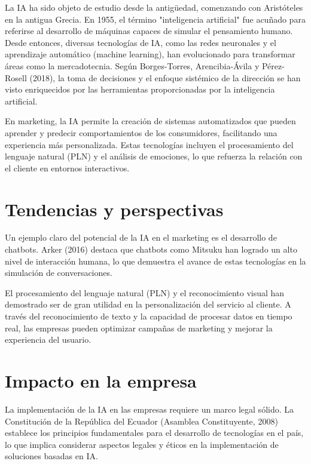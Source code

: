 \documentclass[9pt]{article}
\begin{document}
La IA ha sido objeto de estudio desde la antigüedad, comenzando con Aristóteles en la antigua Grecia. En 1955, el término "inteligencia artificial" fue acuñado para referirse al desarrollo de máquinas capaces de simular el pensamiento humano. Desde entonces, diversas tecnologías de IA, como las redes neuronales y el aprendizaje automático (machine learning), han evolucionado para transformar áreas como la mercadotecnia. Según Borges-Torres, Arencibia-Ávila y Pérez-Rosell (2018), la toma de decisiones y el enfoque sistémico de la dirección se han visto enriquecidos por las herramientas proporcionadas por la inteligencia artificial.
\cite{borges2018toma}

En marketing, la IA permite la creación de sistemas automatizados que pueden aprender y predecir comportamientos de los consumidores, facilitando una experiencia más personalizada. Estas tecnologías incluyen el procesamiento del lenguaje natural (PLN) y el análisis de emociones, lo que refuerza la relación con el cliente en entornos interactivos.

\section*{Tendencias y perspectivas}

Un ejemplo claro del potencial de la IA en el marketing es el desarrollo de chatbots. Arker (2016) destaca que chatbots como Mitsuku han logrado un alto nivel de interacción humana, lo que demuestra el avance de estas tecnologías en la simulación de conversaciones.
\cite{arker2016chatbot}
\newpage

El procesamiento del lenguaje natural (PLN) y el reconocimiento visual han demostrado ser de gran utilidad en la personalización del servicio al cliente. A través del reconocimiento de texto y la capacidad de procesar datos en tiempo real, las empresas pueden optimizar campañas de marketing y mejorar la experiencia del usuario.

\section*{Impacto en la empresa}

La implementación de la IA en las empresas requiere un marco legal sólido. La Constitución de la República del Ecuador (Asamblea Constituyente, 2008) establece los principios fundamentales para el desarrollo de tecnologías en el país, lo que implica considerar aspectos legales y éticos en la implementación de soluciones basadas en IA.
\cite{asamblea2008constitucion}
\cite{borges2018toma}
\end{document}
